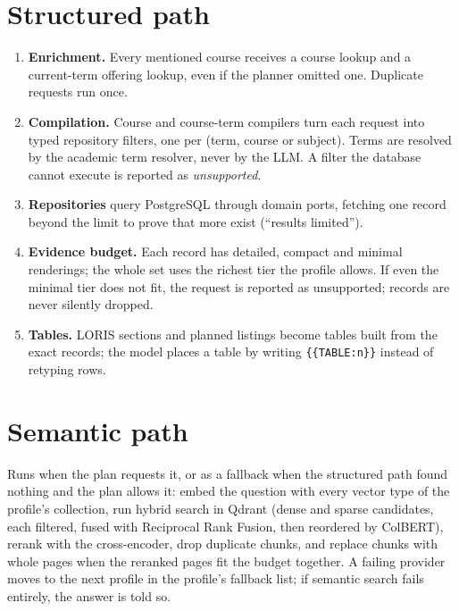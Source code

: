 \documentclass[11pt,letterpaper]{report}
\begin{document}
\section{Structured path}
\begin{enumerate}
  \item \textbf{Enrichment.} Every mentioned course receives a course lookup and a current-term offering
        lookup, even if the planner omitted one. Duplicate requests run once.
  \item \textbf{Compilation.} Course and course-term compilers turn each request into typed repository
        filters, one per (term, course or subject). Terms are resolved by the academic term resolver,
        never by the LLM. A filter the database cannot execute is reported as \emph{unsupported}.
  \item \textbf{Repositories} query PostgreSQL through domain ports, fetching one record beyond the limit
        to prove that more exist (``results limited'').
  \item \textbf{Evidence budget.} Each record has detailed, compact and minimal renderings; the whole set
        uses the richest tier the profile allows. If even the minimal tier does not fit, the request
        is reported as unsupported; records are never silently dropped.
  \item \textbf{Tables.} LORIS sections and planned listings become tables built from the exact records;
        the model places a table by writing \texttt{\{\{TABLE:n\}\}} instead of retyping rows.
\end{enumerate}

\section{Semantic path}
Runs when the plan requests it, or as a fallback when the structured path found nothing and the plan
allows it: embed the question with every vector type of the profile's collection, run hybrid search
in Qdrant (dense and sparse candidates, each filtered, fused with Reciprocal Rank Fusion, then
reordered by ColBERT), rerank with the cross-encoder, drop duplicate chunks, and replace chunks with whole pages
when the reranked pages fit the budget together. A failing provider moves to the next profile in the
profile's fallback list; if semantic search fails entirely, the answer is told so.
\end{document}
